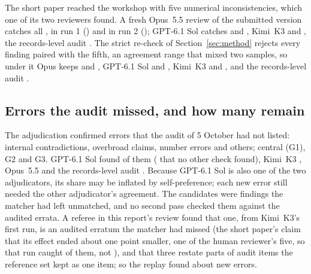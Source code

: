 \documentclass[11pt]{article}
\begin{document}
The short paper reached the workshop with five numerical inconsistencies, which one of its two reviewers found. A fresh Opus~5.5
review of the submitted version catches all \Njudge, in run 1 (\JudgeOpusA) and in run 2 (\JudgeOpusB); GPT-6.1 Sol catches
\JudgeGptA{} and \JudgeGptB, Kimi~K3 \JudgeKimiA{} and \JudgeKimiB, the records-level audit \JudgeCtwo. The strict re-check of
Section~\ref{sec:method} rejects every finding paired with the fifth, an agreement range that mixed two samples, so under it Opus
keeps \StrictJudgeOpusA{} and \StrictJudgeOpusB, GPT-6.1 Sol \StrictJudgeGptA{} and \StrictJudgeGptB, Kimi~K3 \StrictJudgeKimiA{} and
\StrictJudgeKimiB, and the records-level audit \StrictJudgeCtwo.

\subsection{Errors the audit missed, and how many remain}
\label{sec:chao}

The adjudication confirmed \Nnew{} errors that the audit of 5 October had not listed: \NewInternal{} internal contradictions,
\NewScope{} overbroad claims, \NewNum{} number errors and \NewOther{} others; \NewSevGOne{} central (G1), \NewSevGTwo{} G2 and
\NewSevGThree{} G3.
GPT-6.1 Sol found \NewByGpt{} of them (\NewGptOnly{} that no other check found), Kimi~K3 \NewByKimi, Opus~5.5 \NewByOpus{} and
the records-level audit \NewByCtwo. Because GPT-6.1 Sol is also one of the two adjudicators, its share may be inflated by
self-preference; each new error still needed the other adjudicator's agreement. The candidates were findings the matcher had left unmatched, and no
second pass checked them against the audited errata. A referee in this report's review found that one, from Kimi~K3's first run, is an audited erratum the matcher had
missed (the short paper's claim that its effect ended about one point smaller, one of the human reviewer's five, so that run caught
\JudgeKimiADedup{} of them, not \JudgeKimiA), and that three restate parts of audit items the reference set kept as one item; so the
replay found about \NnewDedup{} new errors.
\end{document}

